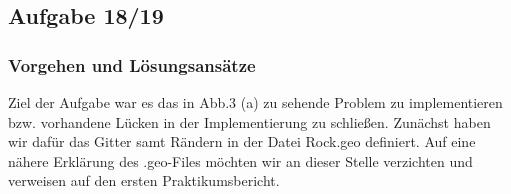 \subsection{Aufgabe 18/19}
\subsubsection{Vorgehen und Lösungsansätze}
\begin{figure}[H]
	\centering
\end{figure}
Ziel der Aufgabe war es das in Abb.3 (a) zu sehende Problem zu implementieren bzw. vorhandene Lücken in der Implementierung zu schließen.
Zunächst haben wir dafür das Gitter samt Rändern in der Datei Rock.geo definiert. 
Auf eine nähere Erklärung des .geo-Files möchten wir an dieser Stelle verzichten und verweisen auf den ersten Praktikumsbericht.


